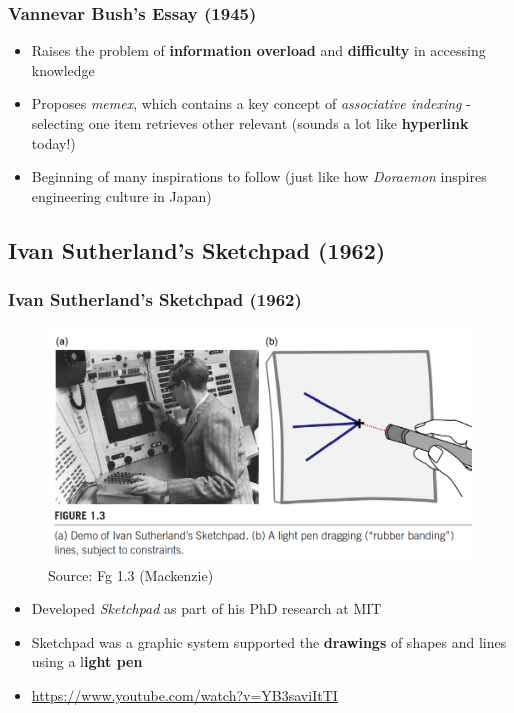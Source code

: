 \documentclass{beamer}
\begin{document}
\begin{frame}
\frametitle{Vannevar Bush's Essay (1945)}
	\begin{itemize}
		\item Raises the problem of \textbf{information overload} and \textbf{difficulty} in accessing knowledge
		\item Proposes \textit{memex}, which contains a key concept of \textit{associative indexing} - selecting one item retrieves other relevant (sounds a lot like \textbf{hyperlink} today!)
		\item Beginning of many inspirations to follow (just like how \textit{Doraemon} inspires engineering culture in Japan)
	\end{itemize}
\end{frame}

\subsection{Ivan Sutherland's Sketchpad (1962)} %
\begin{frame}
\frametitle{Ivan Sutherland's Sketchpad (1962)}
	\centering
	\begin{figure}
		\includegraphics[width=0.5\linewidth]{ivan}
		\caption{Source: Fg 1.3 (Mackenzie)}
	\end{figure}
\begin{itemize}
	\item Developed \textit{Sketchpad} as part of his PhD research at MIT
	\item Sketchpad was a graphic system supported the \textbf{drawings} of shapes and lines using a l\textbf{ight pen}
	\item \url{https://www.youtube.com/watch?v=YB3saviItTI}
\end{itemize}
\end{frame}
\end{document}
